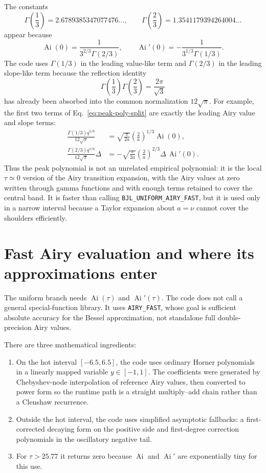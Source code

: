 \documentclass[11pt,a4paper]{article}
\newcommand{\Ai}{\operatorname{Ai}}
\newcommand{\Aip}{\operatorname{Ai}'}
\newcommand{\code}[1]{\texttt{#1}}
\newcommand{\D}{\Delta}
\begin{document}
The constants
\begin{equation}
  \Gamma\left(\frac13\right)=2.6789385347077476\ldots,
  \qquad
  \Gamma\left(\frac23\right)=1.3541179394264004\ldots
\end{equation}
appear because
\begin{equation}
  \Ai(0)=\frac{1}{3^{2/3}\Gamma(2/3)},
  \qquad
  \Ai'(0)=-\frac{1}{3^{1/3}\Gamma(1/3)}.
\end{equation}
The code uses $\Gamma(1/3)$ in the leading value-like term and $\Gamma(2/3)$ in the leading slope-like term because the reflection identity
\begin{equation}
  \Gamma\left(\frac13\right)\Gamma\left(\frac23\right)=\frac{2\pi}{\sqrt3}
\end{equation}
has already been absorbed into the common normalization $12\sqrt{\pi}$.  For example, the first two terms of Eq.~\eqref{eq:peak-poly-split} are exactly the leading Airy value and slope terms:
\begin{align}
  \frac{\Gamma(1/3)q^{5/6}}{12\sqrt\pi}
    &= \sqrt{\frac{\pi}{2a}}\left(\frac{2}{a}\right)^{1/3}\Ai(0),\\
  \frac{\Gamma(2/3)q^{7/6}}{12\sqrt\pi}\D
    &= -\sqrt{\frac{\pi}{2a}}\left(\frac{2}{a}\right)^{2/3}\D\,\Aip(0).
\end{align}
Thus the peak polynomial is not an unrelated empirical polynomial: it is the local $\tau\simeq0$ version of the Airy transition expansion, with the Airy values at zero written through gamma functions and with enough terms retained to cover the central band.  It is faster than calling \code{BJL\_UNIFORM\_AIRY\_FAST}, but it is used only in a narrow interval because a Taylor expansion about $a=\nu$ cannot cover the shoulders efficiently.

\section{Fast Airy evaluation and where its approximations enter}

The uniform branch needs $\Ai(\tau)$ and $\Ai'(\tau)$.  The code does not call a general special-function library.  It uses \code{AIRY\_FAST}, whose goal is sufficient absolute accuracy for the Bessel approximation, not standalone full double-precision Airy values.

There are three mathematical ingredients:
\begin{enumerate}[leftmargin=*]
\item On the hot interval $[-6.5,6.5]$, the code uses ordinary Horner polynomials in a linearly mapped variable $y\in[-1,1]$.  The coefficients were generated by Chebyshev-node interpolation of reference Airy values, then converted to power form so the runtime path is a straight multiply--add chain rather than a Clenshaw recurrence.
\item Outside the hot interval, the code uses simplified asymptotic fallbacks: a first-corrected decaying form on the positive side and first-degree correction polynomials in the oscillatory negative tail.
\item For $\tau>25.77$ it returns zero because $\Ai$ and $\Ai'$ are exponentially tiny for this use.
\end{enumerate}
\end{document}
